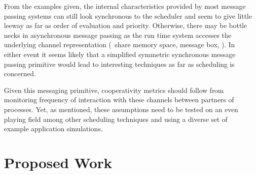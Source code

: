From the examples given, the internal characteristics provided by most message passing systems can still look 
synchronous to the scheduler and seem to give little leeway as far as order of evaluation and priority. Otherwise,
there may be bottle necks in asynchronous message passing as the run time system accesses the underlying channel
representation (\eg~share memory space, message box, \etc). In either event it seems likely that a simplified 
symmetric synchronous message passing primitive would lead to interesting techniques as far as scheduling is 
concerned.

Given this messaging primitive, cooperativity metrics should follow from monitoring frequency of interaction 
with these channels between partners of processes. Yet, as mentioned, these assumptions need to be tested on an 
even playing field among other scheduling techniques and using a diverse set of example application simulations.


\section{Proposed Work} %



